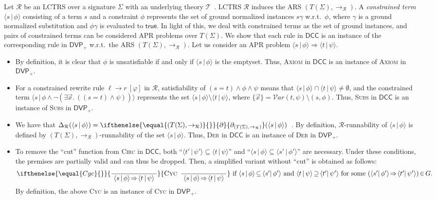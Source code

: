 \documentclass[10pt,a4paper]{article}
\def\cR{\mathcal{R}}
\def\cT{\mathcal{T}}
\newcommand{\symb}[1]{\mathsf{#1}}
\newcommand{\Var}{\mathcal{V}ar}
\newcommand{\Constraint}[1]{[ #1 ]}
\newcommand{\CTerm}[2]{\langle #1 \,|\, #2 \rangle}
\newcommand{\ReachPred}[2]{#1 \Rightarrow #2}
\newcommand{\Derivative}[1][\cR]{\ifthenelse{\equal{#1}{}}{\partial}{\partial_{#1}}}
\newcommand{\RuleName}[1]{{\rm \textsc{#1}}}
\newcommand{\InfRule}[3][]{\ifthenelse{\equal{#1}{}}{\displaystyle\frac{~ #2 ~}{~ #3 ~}}{\mbox{\rm\RuleName{#1}} ~\, \displaystyle\frac{~ #2 ~}{~ #3 ~}
}}
\newcommand{\DVPnew}[1][]{\mathsf{DVP}_+}
\newcommand{\DCC}[1][]{\mathsf{DCC}}
\newcommand{\cTheory}{\cT}
\begin{document}
Let $\cR$ be an LCTRS over a signature $\Sigma$ with an underlying theory $\cTheory$~\cite[Section~3]{CL18}.
LCTRS $\cR$ induces the ARS $(T(\Sigma),\to_\cR)$.
A \emph{constrained term} $\CTerm{s}{\phi}$ consisting of a term $s$ and a constraint $\phi$ represents the set of ground normalized instances $s\gamma$ w.r.t.\ $\phi$, where $\gamma$ is a ground normalized substitution and $\phi\gamma$ is evaluated to $\symb{true}$.
In light of this, we deal with constrained terms as the set of ground instances, and pairs of constrained terms can be considered APR problems over $T(\Sigma)$.
We show that each rule in $\DCC$ is an instance of the corresponding rule in $\DVPnew$ w.r.t.\ the ARS $(T(\Sigma),\to_\cR)$.
Let us consider an APR problem $\ReachPred{\CTerm{s}{\phi}}{\CTerm{t}{\psi}}$.
\begin{itemize}
	\item
	      By definition, it is clear that $\phi$ is unsatisfiable if and only if $\CTerm{s}{\phi}$ is the emptyset.
	      Thus, \RuleName{Axiom} in $\DCC$ is an instance of \RuleName{Axiom} in $\DVPnew$.
	\item
	      For a constrained rewrite rule $\ell \to r ~\Constraint{\varphi}$ in $\cR$,
	      satisfiability of $(s = t) \land \phi \land \psi$ means that
	      $\CTerm{s}{\phi} \cap \CTerm{t}{\psi} \ne \emptyset$, and
	      the constrained term $\CTerm{s}{\phi \land \neg (\exists \vec{x}.\ ((s = t)  \land \psi))}$
	      represents
	      the set $\CTerm{s}{\phi} \setminus \CTerm{t}{\psi}$, where $\{\vec{x}\} = \Var(t,\psi) \setminus(s,\phi)$.
	      Thus, \RuleName{Subs} in $\DCC$ is an instance of \RuleName{Subs} in $\DVPnew$.
	\item
	      We have that $\Delta_\cR(\CTerm{s}{\phi}) = \Derivative[(T(\Sigma),\to_\cR)](\CTerm{s}{\phi})$~\cite[Theorem~1]{CL18}.
	      By definition, $\cR$-runnability of $\CTerm{s}{\phi}$ is defined by $(T(\Sigma),\to_\cR)$-runnability of the set $\CTerm{s}{\phi}$.
	      Thus, \RuleName{Der} in $\DCC$ is an instance of \RuleName{Der} in $\DVPnew$.
	\item
	      To remove the ``cut'' function from \RuleName{Circ} in $\DCC$,
	      both ``$\CTerm{t'}{\psi'} \subseteq \CTerm{t}{\psi}$''
	      and
	      ``$\CTerm{s}{\phi} \subseteq \CTerm{s'}{\phi'}$''
	      are necessary.
	      Under these conditions, the premises are partially valid and can thus be dropped.
	      Then, a simplified variant without ``cut'' is obtained as follows:
	      \label{eq:Cyc-for-LCTRS}
	      \begin{equation*}\InfRule[Cyc]{}{\ReachPred{\CTerm{s}{\phi}\!}{\!\CTerm{t}{\psi}}
		      }
		      ~\mbox{if
			      $\CTerm{s}{\phi} \,{\subseteq}\, \CTerm{s'\!}{\phi'}$
			      and
			      $\CTerm{t}{\psi} \,{\supseteq}\, \CTerm{t'\!}{\psi'}$
			      for some $(\ReachPred{\CTerm{s'\!}{\phi'}\!}{\!\CTerm{t'\!}{\psi'}}) \,{\in}\, G$.}
	      \end{equation*}
	      By definition, the above \RuleName{Cyc} is an instance of \RuleName{Cyc} in $\DVPnew$.
\end{itemize}
\end{document}
